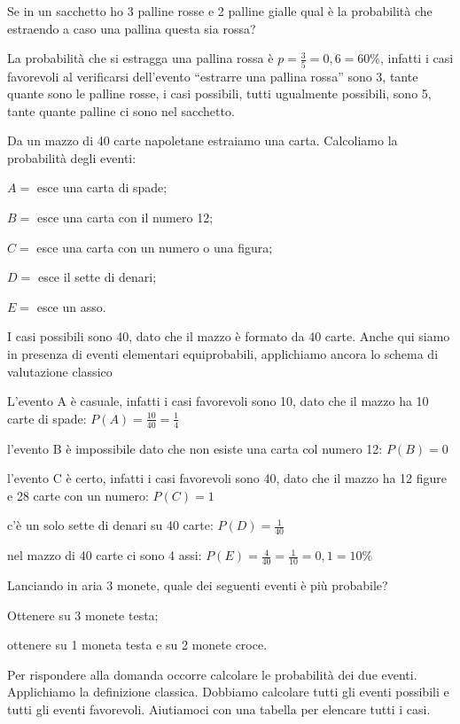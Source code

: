 \begin{exrig}
\begin{esempio}
Se in un sacchetto ho 3 palline rosse e 2 palline gialle qual è la probabilità 
che estraendo a caso una pallina questa sia rossa?

La probabilità che si estragga una pallina rossa è $p=\frac 3 
5=0,6=60\text{\%}$, infatti i casi favorevoli al verificarsi dell'evento 
``estrarre una pallina rossa'' sono 3, tante quante sono le palline rosse, i 
casi possibili, tutti ugualmente possibili, sono 5, tante quante palline ci 
sono 
nel sacchetto.
\end{esempio}

\begin{esempio}
Da un mazzo di 40 carte napoletane estraiamo una carta. Calcoliamo la 
probabilità degli eventi:
\begin{itemize*}
\item $A=$ esce una carta di spade;
\item $B=$ esce una carta con il numero 12;
\item $C=$ esce una carta con un numero o una figura;
\item $D=$ esce il sette di denari;
\item $E=$ esce un asso.
\end{itemize*}
I casi possibili sono 40, dato che il mazzo è formato da 40 carte. Anche qui 
siamo in presenza di eventi elementari equiprobabili, applichiamo ancora lo 
schema di valutazione classico
\begin{itemize*}
\item L'evento A è casuale, infatti i casi favorevoli sono 10, dato che il 
mazzo 
ha 10 carte di spade: $P(A)=\frac{10}{40}=\frac 1 4$
\item l'evento B è impossibile dato che non esiste una carta col numero 12: $ 
P(B)=0 $
\item l'evento C è certo, infatti i casi favorevoli sono 40, dato che il mazzo 
ha 12 figure e 28 carte con un numero: $P(C)=1$
\item c'è un solo sette di denari su 40 carte: $P(D)=\frac 1{40}$
\item nel mazzo di 40 carte ci sono 4 assi: $P(E)=\frac 4{40}=\frac 
1{10}=0,1=10\%$
\end{itemize*}
\end{esempio}

\begin{esempio}
Lanciando in aria 3 monete, quale dei seguenti eventi è più probabile?
\begin{itemize*}
\item Ottenere su 3 monete testa;
\item ottenere su 1 moneta testa e su 2 monete croce.
\end{itemize*}
Per rispondere alla domanda occorre calcolare le probabilità dei due eventi. 
Applichiamo la definizione classica. Dobbiamo calcolare tutti gli eventi 
possibili e tutti gli eventi favorevoli.
Aiutiamoci con una tabella per elencare tutti i casi.


\end{esempio}
\end{exrig}
